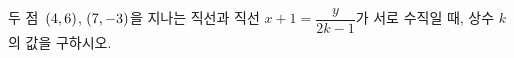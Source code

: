 두 점~$(4{,}\mkern3mu\mathopen{}6)$, $(7{,}\mkern3mu\mathopen{}-3)$을 지나는 직선과 직선 $x+1=\dfrac{y}{2k-1}$가 서로 수직일 때, 상수 $k$의 값을 구하시오.
